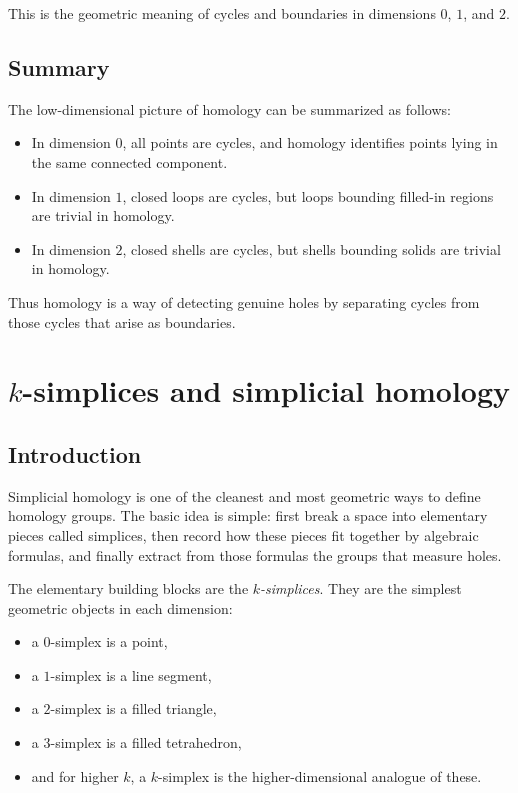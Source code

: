 \documentclass[12pt,a4paper]{article}
\theoremstyle{notespace}
\begin{document}
This is the geometric meaning of cycles and boundaries in dimensions \(0\), \(1\), and \(2\).

\subsection{Summary}

The low-dimensional picture of homology can be summarized as follows:
\begin{itemize}
	\item In dimension \(0\), all points are cycles, and homology identifies points lying in the same connected component.
	\item In dimension \(1\), closed loops are cycles, but loops bounding filled-in regions are trivial in homology.
	\item In dimension \(2\), closed shells are cycles, but shells bounding solids are trivial in homology.
\end{itemize}

Thus homology is a way of detecting genuine holes by separating cycles from those cycles that arise as boundaries.

\section{\texorpdfstring{$k$}{k}-simplices and simplicial homology}

\subsection{Introduction}

Simplicial homology is one of the cleanest and most geometric ways to define homology groups. The basic idea is simple: first break a space into elementary pieces called simplices, then record how these pieces fit together by algebraic formulas, and finally extract from those formulas the groups that measure holes.

The elementary building blocks are the \emph{\(k\)-simplices}. They are the simplest geometric objects in each dimension:
\begin{itemize}
	\item a \(0\)-simplex is a point,
	\item a \(1\)-simplex is a line segment,
	\item a \(2\)-simplex is a filled triangle,
	\item a \(3\)-simplex is a filled tetrahedron,
	\item and for higher \(k\), a \(k\)-simplex is the higher-dimensional analogue of these.
\end{itemize}
\end{document}
